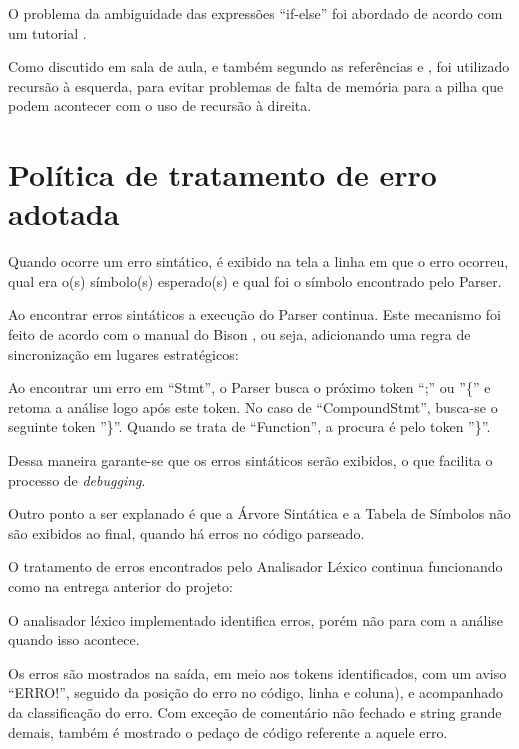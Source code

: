 \documentclass[12pt]{article}
\begin{document}
O problema da ambiguidade das expressões ``if-else'' foi abordado de acordo com um tutorial \cite{lexeyacctutorial}.

Como discutido em sala de aula, e também segundo as referências \cite{aquamentus} e \cite{lexeyacctutorial}, foi utilizado recursão à esquerda, para evitar problemas de falta de memória para a pilha que podem acontecer com o uso de recursão à direita.


\section{Política de tratamento de erro adotada}

\indent

Quando ocorre um erro sintático, é exibido na tela a linha em que o erro ocorreu, qual era o(s) símbolo(s) esperado(s) e qual foi o símbolo encontrado pelo Parser.

Ao encontrar erros sintáticos a execução do Parser continua. Este mecanismo foi feito de acordo com o manual do Bison \cite{bisonmanual}, ou seja, adicionando uma regra de sincronização em lugares estratégicos:

Ao encontrar um erro em ``Stmt'', o Parser busca o próximo token ``;'' ou ''\{'' e retoma a análise logo após este token. No caso de ``CompoundStmt'', busca-se o seguinte token ''\}''. Quando se trata de ``Function'', a procura é pelo token ''\}''.

Dessa maneira garante-se que os erros sintáticos serão exibidos, o que facilita o processo de \textit{debugging}.

Outro ponto a ser explanado é que a Árvore Sintática e a Tabela de Símbolos não são exibidos ao final, quando há erros no código parseado.

O tratamento de erros encontrados pelo Analisador Léxico continua funcionando como na entrega anterior do projeto:

O analisador léxico implementado identifica erros, porém não para com a análise quando isso acontece.

Os erros são mostrados na saída, em meio aos tokens identificados, com um aviso ``ERRO!'', seguido da posição do erro no código, linha e coluna), e acompanhado da classificação do erro. Com exceção de comentário não fechado e string grande demais, também é mostrado o pedaço de código referente a aquele erro.
\end{document}
